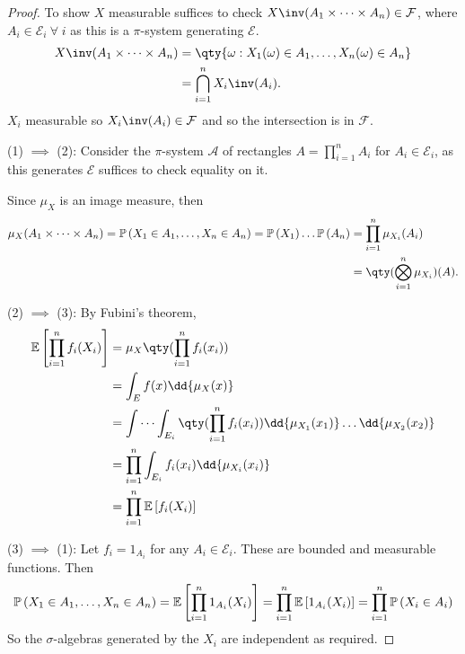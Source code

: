 \begin{proof}
	To show $X$ measurable suffices to check $X\inv(A_1 \times \dots \times A_n) \in \mathcal{F}$, where $A_i \in \mathcal{E}_i \ \forall \; i$ as this is a $\pi$-system generating $\mathcal{E}$.
	\begin{align*}
		X\inv(A_1 \times \dots \times A_n) &= \qty{\omega : X_1(\omega) \in A_1, \dots, X_n(\omega) \in A_n} \\
		&= \bigcap_{i = 1}^n X_i\inv(A_i).
	\end{align*}
	$X_i$ measurable so $X_i\inv(A_i) \in \mathcal{F}$ and so the intersection is in $\mathcal{F}$.

	(1) $\implies$ (2):
	Consider the $\pi$-system $\mathcal A$ of rectangles $A = \prod_{i=1}^n A_i$ for $A_i \in \mathcal E_i$, as this generates $\mathcal{E}$ suffices to check equality on it.

	Since $\mu_X$ is an image measure, then
	\begin{align*}
		\mu_X(A_1 \times \dots \times A_n) = \prob{X_1 \in A_1, \dots, X_n \in A_n} = \prob{X_1} \dots \prob{A_n} &= \prod_{i=1}^n \mu_{X_i}(A_i) \\
		&= \qty(\bigotimes_{i=1}^n \mu_{X_i})(A).
	\end{align*}

	(2) $\implies$ (3):
	By Fubini's theorem,
	\begin{align*}
		\expect{\prod_{i=1}^n f_i(X_i)} &= \mu_X\qty(\prod_{i=1}^n f_i(x_i)) \\
		&= \int_E f(x) \dd{\mu_X(x)} \\
		&= \idotsint_{E_i} \qty(\prod_{i=1}^n f_i(x_i)) \dd{\mu_{X_1}(x_1)} \dots \dd{\mu_{X_2}(x_2)} \\
		&= \prod_{i=1}^n \int_{E_i} f_i(x_i) \dd{\mu_{X_i}(x_i)} \\
		&= \prod_{i=1}^n \expect{f_i(X_i)}
	\end{align*}

	(3) $\implies$ (1):
	Let $f_i = 1_{A_i}$ for any $A_i \in \mathcal E_i$.
	These are bounded and measurable functions.
	Then
	\[ \mathbb{P}\left({X_1 \in A_1, \dots, X_n \in A_n}\right) = \mathbb{E}\left[{\prod_{i=1}^n 1_{A_i}(X_i)}\right] = \prod_{i=1}^n \mathbb{E}\left[{1_{A_i}(X_i)}\right] = \prod_{i=1}^n \mathbb{P}\left({X_i \in A_i}\right) \]
	So the $\sigma$-algebras generated by the $X_i$ are independent as required.
\end{proof}
